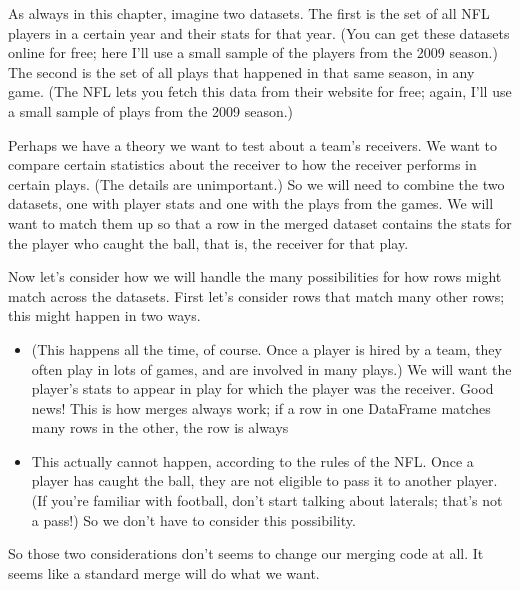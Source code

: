 \documentclass[letterpaper,10pt,english]{sphinxmanual}
\begin{document}
As always in this chapter, imagine two datasets.  The first is the set of all NFL players in a certain year and their stats for that year.  (You can get these datasets online for free; here I’ll use a small sample of the players from the 2009 season.)  The second is the set of all plays that happened in that same season, in any game.  (The NFL lets you fetch this data from their website for free; again, I’ll use a small sample of plays from the 2009 season.)

Perhaps we have a theory we want to test about a team’s receivers.  We want to compare certain statistics about the receiver to how the receiver performs in certain plays.  (The details are unimportant.)  So we will need to combine the two datasets, one with player stats and one with the plays from the games.  We will want to match them up so that a row in the merged dataset contains the stats for the player who caught the ball, that is, the receiver for that play.

Now let’s consider how we will handle the many possibilities for how rows might match across the datasets.  First let’s consider rows that match many other rows; this might happen in two ways.
\begin{itemize}
\item {} 
  (This happens all the time, of course.  Once a player is hired by a team, they often play in lots of games, and are involved in many plays.)  We will want the player’s stats to appear in  play for which the player was the receiver.  Good news!  This is how merges always work; if a row in one DataFrame matches many rows in the other, the row is always 

\item {} 
  This actually cannot happen, according to the rules of the NFL.  Once a player has caught the ball, they are not eligible to pass it to another player.  (If you’re familiar with football, don’t start talking about laterals; that’s not a pass!)  So we don’t have to consider this possibility.

\end{itemize}

So those two considerations don’t seems to change our merging code at all.  It seems like a standard merge will do what we want.
\end{document}
